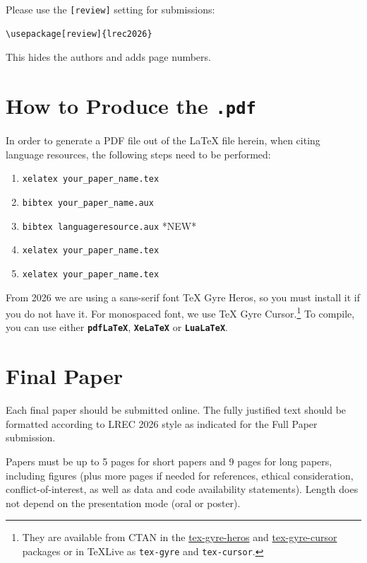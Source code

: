 \documentclass[10pt, a4paper]{article}
\begin{document}
Please use the \texttt{[review]} setting for submissions:

\begin{verbatim}
\usepackage[review]{lrec2026}
\end{verbatim}

This hides the authors and adds page numbers.

\section{How to Produce the \texttt{.pdf}}
\label{sec:append-how-prod}


In order to generate a PDF file out of the LaTeX file herein, when citing language resources, the following steps need to be performed:

\begin{enumerate}
\item \texttt{xelatex your\_paper\_name.tex}
\item \texttt{bibtex your\_paper\_name.aux}
\item \texttt{bibtex languageresource.aux}    *NEW*
\item \texttt{xelatex your\_paper\_name.tex}
\item \texttt{xelatex your\_paper\_name.tex}
\end{enumerate}

From 2026 we are using a sans-serif font TeX Gyre Heros, so you must
install it if you do not have it.  For monospaced font, we use TeX
Gyre Cursor.\footnote{They are available from CTAN in the
  \href{https://ctan.org/pkg/tex-gyre-heros}{tex-gyre-heros} and
  \href{https://ctan.org/pkg/tex-gyre-cursor}{tex-gyre-cursor} packages
    or in TeXLive as \texttt{tex-gyre} and \texttt{tex-cursor}.}  To
  compile, you can use either \textbf{\texttt{pdfLaTeX}},
  \textbf{\texttt{XeLaTeX}} or \textbf{\texttt{LuaLaTeX}}.

\section{Final Paper}

Each final paper should be submitted online. The fully justified text should be formatted according to LREC 2026 style as indicated for the Full Paper submission.

Papers must be up to 5 pages for short papers and 9 pages for long
papers, including figures (plus more pages if needed for references,
ethical consideration, conflict-of-interest, as well as data and code
availability statements).  Length does not depend on the presentation
mode (oral or poster).
\end{document}
